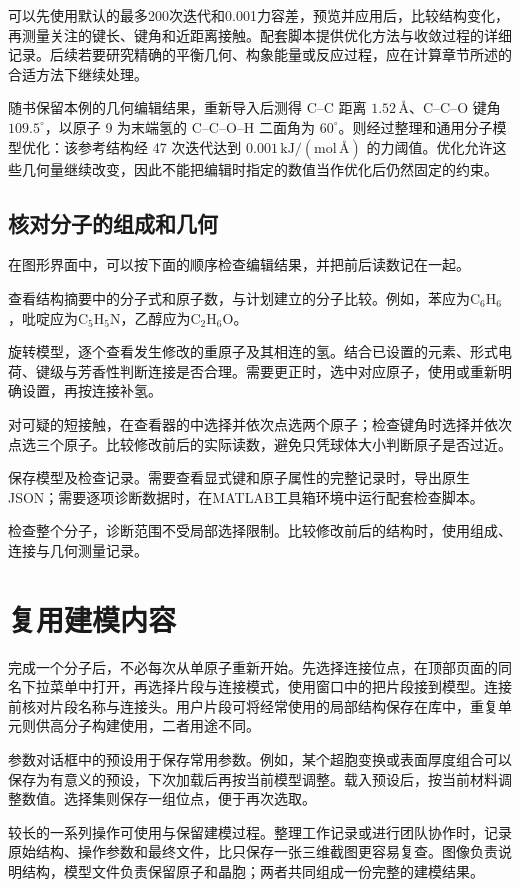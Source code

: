 可以先使用默认的最多200次迭代和0.001力容差，预览并应用后，比较结构变化，再测量关注的键长、键角和近距离接触。配套脚本提供优化方法与收敛过程的详细记录。后续若要研究精确的平衡几何、构象能量或反应过程，应在计算章节所述的合适方法下继续处理。

随书保留本例的几何编辑结果，重新导入后测得 C--C 距离 $1.52\,\text{\AA}$、C--C--O 键角 $109.5^\circ$，以原子 9 为末端氢的 C--C--O--H 二面角为 $60^\circ$。\mbox{}则经过整理和通用分子模型优化：该参考结构经 47 次迭代达到 $0.001\,\mathrm{kJ/(mol\,\text{\AA})}$ 的力阈值。优化允许这些几何量继续改变，因此不能把编辑时指定的数值当作优化后仍然固定的约束。

\subsection{核对分子的组成和几何}\label{sec:molecule-manual-check}

在图形界面中，可以按下面的顺序检查编辑结果，并把前后读数记在一起。

\begin{steps}
  \item 查看结构摘要中的分子式和原子数，与计划建立的分子比较。例如，苯应为$\mathrm{C_6H_6}$，吡啶应为$\mathrm{C_5H_5N}$，乙醇应为$\mathrm{C_2H_6O}$。
  \item 旋转模型，逐个查看发生修改的重原子及其相连的氢。结合已设置的元素、形式电荷、键级与芳香性判断连接是否合理。需要更正时，选中对应原子，使用或重新明确设置，再按连接补氢。
  \item 对可疑的短接触，在查看器的中选择并依次点选两个原子；检查键角时选择并依次点选三个原子。比较修改前后的实际读数，避免只凭球体大小判断原子是否过近。
  \item 保存模型及检查记录。需要查看显式键和原子属性的完整记录时，导出原生JSON；需要逐项诊断数据时，在MATLAB\regmark{}工具箱环境中运行配套检查脚本。
\end{steps}

检查整个分子，诊断范围不受局部选择限制。比较修改前后的结构时，使用组成、连接与几何测量记录。

\section{复用建模内容}

完成一个分子后，不必每次从单原子重新开始。先选择连接位点，在顶部页面的同名下拉菜单中打开，再选择片段与连接模式，使用窗口中的把片段接到模型。连接前核对片段名称与连接头。用户片段可将经常使用的局部结构保存在库中，重复单元则供高分子构建使用，二者用途不同。

参数对话框中的预设用于保存常用参数。例如，某个超胞变换或表面厚度组合可以保存为有意义的预设，下次加载后再按当前模型调整。载入预设后，按当前材料调整数值。选择集则保存一组位点，便于再次选取。

较长的一系列操作可使用与保留建模过程。整理工作记录或进行团队协作时，记录原始结构、操作参数和最终文件，比只保存一张三维截图更容易复查。图像负责说明结构，模型文件负责保留原子和晶胞；两者共同组成一份完整的建模结果。
